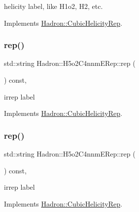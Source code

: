helicity label, like H1o2, H2, etc. 

Implements \mbox{\hyperlink{structHadron_1_1CubicHelicityRep_af1096946b7470edf0a55451cc662f231}{Hadron\+::\+Cubic\+Helicity\+Rep}}.

\mbox{\label{structHadron_1_1H5o2C4nnmERep_abf60b976264ddcc15c9d98b220092085}} 
\subsubsection{\texorpdfstring{rep()}{rep()}\hspace{0.1cm}{\footnotesize\ttfamily [1/2]}}
{\footnotesize\ttfamily std\+::string Hadron\+::\+H5o2\+C4nnm\+E\+Rep\+::rep (\begin{DoxyParamCaption}{ }\end{DoxyParamCaption}) const\hspace{0.3cm}{\ttfamily [inline]}, {\ttfamily [virtual]}}

irrep label 

Implements \mbox{\hyperlink{structHadron_1_1CubicHelicityRep_a8cdd86f068a167dc96faef02bfb8a33d}{Hadron\+::\+Cubic\+Helicity\+Rep}}.

\mbox{\label{structHadron_1_1H5o2C4nnmERep_abf60b976264ddcc15c9d98b220092085}} 
\subsubsection{\texorpdfstring{rep()}{rep()}\hspace{0.1cm}{\footnotesize\ttfamily [2/2]}}
{\footnotesize\ttfamily std\+::string Hadron\+::\+H5o2\+C4nnm\+E\+Rep\+::rep (\begin{DoxyParamCaption}{ }\end{DoxyParamCaption}) const\hspace{0.3cm}{\ttfamily [inline]}, {\ttfamily [virtual]}}

irrep label 

Implements \mbox{\hyperlink{structHadron_1_1CubicHelicityRep_a8cdd86f068a167dc96faef02bfb8a33d}{Hadron\+::\+Cubic\+Helicity\+Rep}}.

\mbox{\label{structHadron_1_1H5o2C4nnmERep_a5b15b3ef270c38266d305dfec412684d}} 
